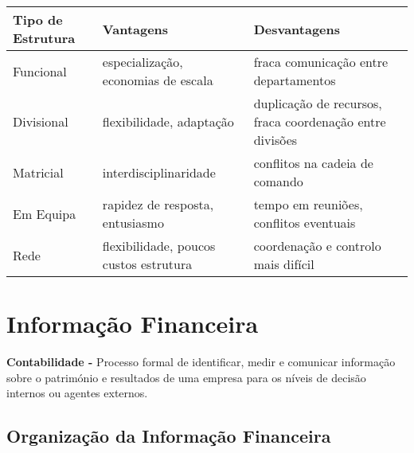\documentclass[11pt]{article}
\begin{document}
\begin{tabular}{ | C{90pt} | C{100pt} | C{150pt} | }
    \hline
    Tipo de Estrutura & Vantagens                              & Desvantagens                                             \\\hline
    Funcional         & especialização, economias de escala    & fraca comunicação entre departamentos                    \\\hline
    Divisional        & flexibilidade, adaptação               & duplicação de recursos, fraca coordenação entre divisões \\\hline
    Matricial         & interdisciplinaridade                  & conflitos na cadeia de comando                           \\\hline
    Em Equipa         & rapidez de resposta, entusiasmo        & tempo em reuniões, conflitos eventuais                   \\\hline
    Rede              & flexibilidade, poucos custos estrutura & coordenação e controlo mais difícil                      \\\hline
\end{tabular}

\newpage

\section{Informação Financeira}

\textbf{Contabilidade -} Processo formal de identificar, medir e comunicar informação sobre o património e resultados de uma empresa para os níveis de decisão internos ou agentes externos.

\subsection{Organização da Informação Financeira}
\end{document}
